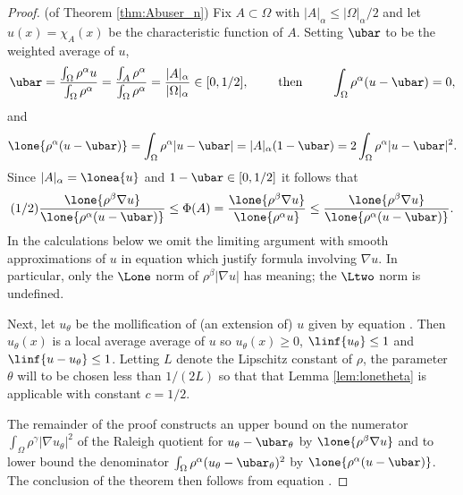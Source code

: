 \begin{proof} (of Theorem \ref{thm:Abuser_n})
Fix $A \subset \Omega$ with $|A|_\alpha \leq |\Omega|_\alpha / 2$ and let
$u(x) = \chi_A(x)$ be the characteristic function of $A$. Setting 
$\ubar$ to be the weighted average of $u$,
$$
\ubar 
= \frac{\int_\Omega \rho^\alpha u}{\int_\Omega \rho^\alpha}
= \frac{\int_A \rho^\alpha}{\int_\Omega \rho^\alpha}
= \frac{|A|_\alpha}{|\Omega|_\alpha} \in [0,1/2],
\qquad \text{ then } \qquad
\int_\Omega \rho^\alpha (u-\ubar) = 0,
$$
and
$$
\lone{\rho^\alpha(u-\ubar)} 
= \int_\Omega \rho^\alpha |u-\ubar| = |A|_\alpha (1-\ubar)
= 2 \int_\Omega \rho^\alpha |u-\ubar|^2.
$$
Since $|A|_\alpha = \lonea{u}$ and $1-\ubar \in [0,1/2]$ it follows that
\begin{equation} \label{eqn:APhiA}
  (1/2) \frac{\lone{\rho^\beta \nabla u}}{\lone{\rho^\alpha(u-\ubar)}} 
  \leq \Phi(A) = \frac{\lone{\rho^\beta \nabla u}}{\lone{\rho^\alpha u}}
  \leq \frac{\lone{\rho^\beta \nabla u}}{\lone{\rho^\alpha(u-\ubar)}}.
\end{equation}
In the calculations below we omit the limiting argument with smooth
approximations of $u$ in equation  which justify
formula involving $\nabla u$. In particular, only the $\Lone$ norm
of $\rho^\beta |\nabla u|$ has meaning; the $\Ltwo$ norm is undefined.

Next, let $u_\theta$ be the mollification of (an extension of) $u$
given by equation . Then $u_\theta(x)$ is a local
average average of $u$ so $u_\theta(x) \geq 0$, $\linf{u_\theta} \leq
1$ and $\linf{u-u_\theta} \leq 1$.  Letting $L$ denote the Lipschitz
constant of $\rho$, the parameter $\theta$ will to be chosen 
less than $1/(2L)$ so that that Lemma \ref{lem:lonetheta} is applicable
with constant $c = 1/2$.

The remainder of the proof constructs an upper bound on the numerator
$\int_\Omega \rho^\gamma |\nabla u_\theta|^2$ of the Raleigh quotient
for $u_\theta - \ubar_\theta$ by $\lone{\rho^\beta \nabla u}$ and to
lower bound the denominator $\int_\Omega \rho^\alpha (u_\theta -
\ubar_\theta)^2$ by $\lone{\rho^\alpha (u-\ubar)}$. The conclusion
of the theorem then follows from equation .


\end{proof}
